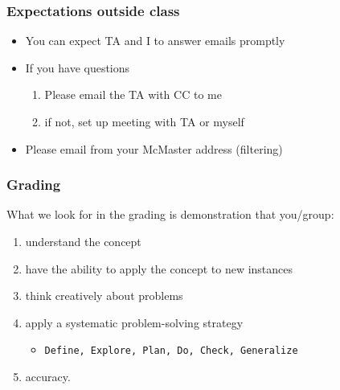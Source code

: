 \begin{frame}\frametitle{Expectations outside class}
	\begin{itemize}
		\item	You can expect TA and I to answer emails promptly
		\item	If you have questions
			\begin{enumerate}
				\item	Please email the TA with CC to me \hfill {\tiny{\color{myOrange}{$\longleftarrow$ hopefully this solves your problem}}}
				\item	if not, set up meeting with TA or myself
			\end{enumerate}
		\item	Please email from your McMaster address (filtering)
	\end{itemize}
\end{frame}

\begin{frame}\frametitle{Grading}
	What we look for in the grading is demonstration that you/group:
	\begin{enumerate}
		\item	understand the concept
		\item	have the ability to apply the concept to new instances
		\item	think creatively about problems
		\item	apply a systematic problem-solving strategy
		\begin{itemize}
			\item	\texttt{Define, Explore, Plan, Do, Check, Generalize}
		\end{itemize}
		\item	accuracy.
	\end{enumerate}
\end{frame}

